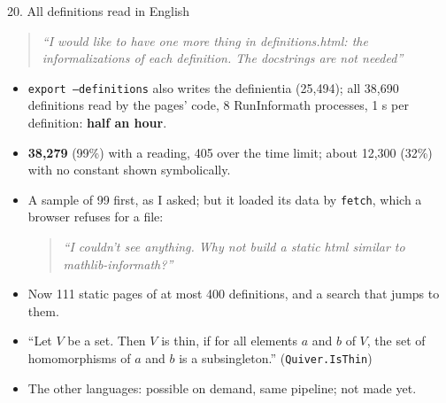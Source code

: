 \documentclass[10pt,aspectratio=169]{beamer}
\newcommand{\bad}[1]{\textcolor{warn}{#1}}
\newcommand{\prompt}[1]{\begin{quote}\small\itshape ``#1''\end{quote}}
\begin{document}
\begin{frame}{20. All definitions read in English}
  \small
  \prompt{I would like to have one more thing in definitions.html: the informalizations of each
  definition. The docstrings are not needed}
  \begin{itemize}
    \item \texttt{export --definitions} also writes the definientia (25,494); all 38,690
          definitions read by the pages' code, 8 RunInformath processes, 1 s per definition:
          \textbf{half an hour}.
    \item \textbf{38,279} (99\%) with a reading, 405 over the time limit; about 12,300 (32\%)
          with no constant shown symbolically.
    \item A sample of 99 first, as I asked; but it loaded its data by \bad{\texttt{fetch}}, which
          a browser refuses for a file: \prompt{I couldn't see anything. Why not build a static html
          similar to mathlib-informath?}
    \item Now 111 static pages of at most 400 definitions, and a search that jumps to them.
    \item ``Let $V$ be a set. Then $V$ is thin, if for all elements $a$ and $b$ of $V$, the set
          of homomorphisms of $a$ and $b$ is a subsingleton.'' (\texttt{Quiver.IsThin})
    \item The other languages: possible on demand, same pipeline; not made yet.
  \end{itemize}
\end{frame}
\end{document}
